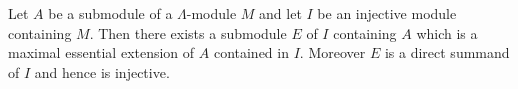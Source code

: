 Let $A$ be a submodule of a $\Lambda$-module $M$ and let $I$ be an injective module containing $M$. Then there exists a submodule $E$ of $I$ containing $A$ which is a maximal essential extension of $A$ contained in $I$. Moreover $E$ is a direct summand of $I$ and hence is injective.